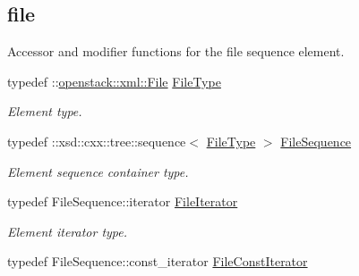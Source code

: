 \subsection*{file}
\label{_amgrp8c7dd922ad47494fc02c388e12c00eac}
Accessor and modifier functions for the file sequence element. \begin{DoxyCompactItemize}
\item 
\hypertarget{classopenstack_1_1xml_1_1Personality_ad3b06c6451476d96639ce8c0e23b71c6}{
typedef ::\hyperlink{classopenstack_1_1xml_1_1File}{openstack::xml::File} \hyperlink{classopenstack_1_1xml_1_1Personality_ad3b06c6451476d96639ce8c0e23b71c6}{FileType}}
\label{classopenstack_1_1xml_1_1Personality_ad3b06c6451476d96639ce8c0e23b71c6}

\begin{DoxyCompactList}\small\item\em Element type. \item\end{DoxyCompactList}\item 
\hypertarget{classopenstack_1_1xml_1_1Personality_abbaf1d8ddffe77ba545048797e251b0b}{
typedef ::xsd::cxx::tree::sequence$<$ \hyperlink{classopenstack_1_1xml_1_1File}{FileType} $>$ \hyperlink{classopenstack_1_1xml_1_1Personality_abbaf1d8ddffe77ba545048797e251b0b}{FileSequence}}
\label{classopenstack_1_1xml_1_1Personality_abbaf1d8ddffe77ba545048797e251b0b}

\begin{DoxyCompactList}\small\item\em Element sequence container type. \item\end{DoxyCompactList}\item 
\hypertarget{classopenstack_1_1xml_1_1Personality_a30297ca503652093e7438ffeeb03d7d2}{
typedef FileSequence::iterator \hyperlink{classopenstack_1_1xml_1_1Personality_a30297ca503652093e7438ffeeb03d7d2}{FileIterator}}
\label{classopenstack_1_1xml_1_1Personality_a30297ca503652093e7438ffeeb03d7d2}

\begin{DoxyCompactList}\small\item\em Element iterator type. \item\end{DoxyCompactList}\item 
\hypertarget{classopenstack_1_1xml_1_1Personality_ac6bae56fd71442472614d40642e5f432}{
typedef FileSequence::const\_\-iterator \hyperlink{classopenstack_1_1xml_1_1Personality_ac6bae56fd71442472614d40642e5f432}{FileConstIterator}}
\label{classopenstack_1_1xml_1_1Personality_ac6bae56fd71442472614d40642e5f432}


\end{DoxyCompactItemize}
